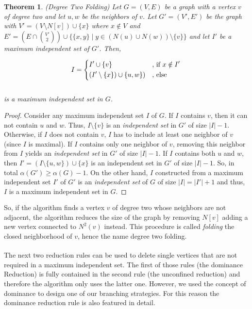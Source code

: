 \documentclass[]{article}
\newtheorem{theorem}{Theorem}
\begin{document}
\begin{theorem} (Degree Two Folding) Let $G=(V,E)$ be a graph with a vertex $v$ of degree two and let $u,w$ be the neighbors of $v$. Let $G'=(V',E')$ be the graph with $V'=(V\setminus N[v])\cup \{x\}$ where $x\notin V$ and $E'=(E\cap \binom{V'}{2})\cup\{ \{x,y\}\;|\;y\in(N(u)\cup N(w))\setminus\{v\} \}$ and let $I'$ be a maximum independent set of $G'$. Then,
	
	\[I=\begin{dcases}
	I'\cup \{v\} & \text{, if }x\notin I'\\
	(I'\setminus\{x\})\cup \{u,w\}) & \text{, else}%
	\end{dcases}\]\\
	is a maximum independent set in $G$.
\end{theorem}
\begin{proof}
	Consider any maximum independent set $I$ of $G$. If $I$ contains $v$, then it can not contain $u$ and $w$. Thus, $I\setminus\{v\}$ is an \textit{independent set} in $G'$ of size $|I| - 1$. Otherwise, if $I$ does not contain $v$, $I$ has to include at least one neighbor of $v$ (since $I$ is maximal). If $I$ contains only one neighbor of $v$, removing this neighbor from $I$ yields an \textit{independent set} in $G'$ of size $|I|-1$. If $I$ contains both $u$ and $w$, then $I'=(I\setminus\{u,w\})\cup\{x\}$ is an independent set in $G'$ of size $|I|-1$. So, in total $\alpha(G')\geq \alpha(G) -1$. On the other hand, $I$ constructed from a maximum independent set $I'$ of $G'$ is an \textit{independent set} of $G$ of size $|I| = |I'|+1$ and thus, $I$ is a maximum independent set in $G$.
\end{proof}

So, if the algorithm finds a vertex $v$ of degree two whose neighbors are not adjacent, the algorithm reduces the size of the graph by removing $N[v]$ adding a new vertex connected to $N^2(v)$ instead. This procedure is called \textit{folding} the closed neighborhood of $v$, hence the name degree two folding.\paragraph{}
The next two reduction rules can be used to delete single vertices that are not required in a maximum independent set. The first of those rules (the dominance Reduction) is fully contained in the second rule (the unconfined reduction) and therefore the algorithm only uses the latter one. However, we used the concept of dominance to design one of our branching strategies. For this reason the dominance reduction rule is also featured in detail.
\end{document}
